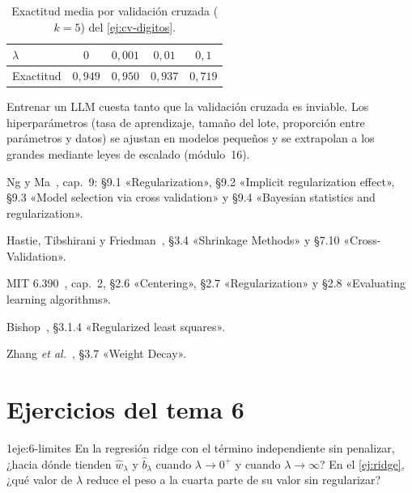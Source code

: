 \begin{table}[h]
\centering\small
\caption{Exactitud media por validación cruzada ($k=5$) del \cref{ej:cv-digitos}.}\label{tab:cv}
\begin{tabular}{@{}lcccc@{}}
\toprule
$\lambda$ & $0$ & $0{,}001$ & $0{,}01$ & $0{,}1$ \\
\midrule
Exactitud & $0{,}949$ & $0{,}950$ & $0{,}937$ & $0{,}719$ \\
\bottomrule
\end{tabular}
\end{table}

\begin{observacion}
Entrenar un LLM cuesta tanto que la validación cruzada es inviable. Los hiperparámetros (tasa de aprendizaje, tamaño del lote, proporción entre parámetros y datos) se ajustan en modelos pequeños y se extrapolan a los grandes mediante leyes de escalado (módulo~16).
\end{observacion}

\begin{lecturas}
\item Ng y Ma~\cite{cs229}, cap.~9: §9.1 «Regularization», §9.2 «Implicit regularization effect», §9.3 «Model selection via cross validation» y §9.4 «Bayesian statistics and regularization».
\item Hastie, Tibshirani y Friedman~\cite{esl}, §3.4 «Shrinkage Methods» y §7.10 «Cross-Validation».
\item MIT 6.390~\cite{mit6390}, cap.~2, §2.6 «Centering», §2.7 «Regularization» y §2.8 «Evaluating learning algorithms».
\item Bishop~\cite{bishop}, §3.1.4 «Regularized least squares».
\item Zhang \emph{et al.}~\cite{d2l}, §3.7 «Weight Decay».
\end{lecturas}

\section*{Ejercicios del tema 6}

\begin{ejercicio}{1}{eje:6-limites}
En la regresión ridge con el término independiente sin penalizar, ¿hacia dónde tienden $\hat w_\lambda$ y $\hat b_\lambda$ cuando $\lambda\to 0^{+}$ y cuando $\lambda\to\infty$? En el \cref{ej:ridge}, ¿qué valor de $\lambda$ reduce el peso a la cuarta parte de su valor sin regularizar?
\end{ejercicio}

